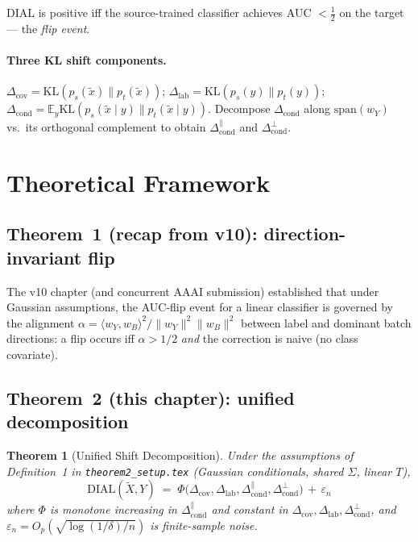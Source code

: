 \documentclass{article}
\newtheorem{theorem}{Theorem}
\newcommand{\E}{\mathbb{E}}
\newcommand{\KL}{\mathrm{KL}}
\newcommand{\dial}{\mathrm{DIAL}}
\begin{document}
DIAL is positive iff the source-trained classifier achieves AUC $<\tfrac12$
on the target — the \emph{flip event}.

\paragraph{Three KL shift components.}
$\Delta_{\text{cov}}=\KL(p_s(\tilde x)\|p_t(\tilde x))$;
$\Delta_{\text{lab}}=\KL(p_s(y)\|p_t(y))$;
$\Delta_{\text{cond}}=\E_y\KL(p_s(\tilde x\mid y)\|p_t(\tilde x\mid y))$.
Decompose $\Delta_{\text{cond}}$ along $\mathrm{span}(w_Y)$ vs.\ its
orthogonal complement to obtain
$\Delta_{\text{cond}}^{\parallel}$ and $\Delta_{\text{cond}}^{\perp}$.

\section{Theoretical Framework}
\label{sec:theory}

\subsection{Theorem~1 (recap from v10): direction-invariant flip}
The v10 chapter (and concurrent AAAI submission) established that under
Gaussian assumptions, the AUC-flip event for a linear classifier is
governed by the alignment $\alpha=\langle w_Y,w_B\rangle^{2}/\|w_Y\|^{2}\|w_B\|^{2}$
between label and dominant batch directions: a flip occurs iff
$\alpha>1/2$ \emph{and} the correction is naive (no class covariate).

\subsection{Theorem~2 (this chapter): unified decomposition}

\begin{theorem}[Unified Shift Decomposition]
\label{thm:main}
Under the assumptions of Definition~1 in \texttt{theorem2\_setup.tex}
(Gaussian conditionals, shared $\Sigma$, linear $T$),
\begin{equation}
   \dial(\tilde X,Y)\;=\;\Phi\!\bigl(\Delta_{\text{cov}},\Delta_{\text{lab}},
      \Delta_{\text{cond}}^{\parallel},\Delta_{\text{cond}}^{\perp}\bigr)\,+\,\varepsilon_n
   \label{eq:thm2}
\end{equation}
where $\Phi$ is monotone increasing in $\Delta_{\text{cond}}^{\parallel}$
and constant in $\Delta_{\text{cov}},\Delta_{\text{lab}},
\Delta_{\text{cond}}^{\perp}$, and
$\varepsilon_n=O_p(\sqrt{\log(1/\delta)/n})$ is finite-sample noise.
\end{theorem}
\end{document}
